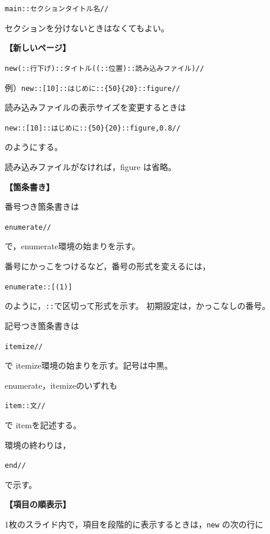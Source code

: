 \documentclass[papersize,a4paper,12pt,uplatex]{jsarticle}
\begin{document}
\hspace{10mm}\verb|main::セクションタイトル名//|
 
セクションを分けないときはなくてもよい。

\vspace{\baselineskip}
 {\bf 【新しいページ】}
 
\hspace{10mm}\verb|new(::行下げ)::タイトル((::位置)::読み込みファイル)//|
 
 例）\verb|new::[10]::はじめに::{50}{20}::figure//|
 
読み込みファイルの表示サイズを変更するときは
 
 \hspace{10mm}\verb|new::[10]::はじめに::{50}{20}::figure,0.8//|
 
のようにする。 

読み込みファイルがなければ，figure は省略。
 
\vspace{\baselineskip}
 {\bf 【箇条書き】}
 
番号つき箇条書きは

 \hspace{10mm}\verb|enumerate//|
 
 で，enumerate環境の始まりを示す。

番号にかっこをつけるなど，番号の形式を変えるには，

\hspace{10mm}\verb|enumerate::[(1)]|

のように，\verb|::|で区切って形式を示す。 初期設定は，かっこなしの番号。

記号つき箇条書きは

\hspace{10mm}\verb|itemize//|
 
で itemize環境の始まりを示す。記号は中黒。
  
enumerate，itemizeのいずれも

\hspace{10mm}\verb|item::文//|
 
で itemを記述する。

環境の終わりは，

\hspace{10mm}\verb|end//|

で示す。

\vspace{\baselineskip}
{\bf 【項目の順表示】}

1枚のスライド内で，項目を段階的に表示するときは，\verb|new| の次の行に
\end{document}
